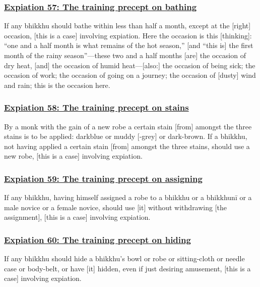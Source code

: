 \subsubsection*{\hyperref[pac57]{Expiation 57: The training precept on bathing}}
\label{exp57}
If any bhikkhu should bathe within less than half a month, except at the [right] occasion, [this is a case] involving expiation. Here the occasion is this [thinking]: ``one and a half month is what remains of the hot season,'' [and ``this is] the first month of the rainy season''—these two and a half months [are] the occasion of dry heat, [and] the occasion of humid heat—[also:] the occasion of being sick; the occasion of work; the occasion of going on a journey; the occasion of [dusty] wind and rain; this is the occasion here.



\subsubsection*{\hyperref[pac58]{Expiation 58: The training precept on stains}}
\label{exp58}
By a monk with the gain of a new robe a certain stain [from] amongst the three stains is to be applied: darkblue or muddy [-grey] or dark-brown. If a bhikkhu, not having applied a certain stain [from] amongst the three stains, should use a new robe, [this is a case] involving expiation.



\subsubsection*{\hyperref[pac59]{Expiation 59: The training precept on assigning}}
\label{exp59}
If any bhikkhu, having himself assigned a robe to a bhikkhu or a bhikkhunī or a male novice or a female novice, should use [it] without withdrawing [the assignment], [this is a case] involving expiation.



\subsubsection*{\hyperref[pac60]{Expiation 60: The training precept on hiding}}
\label{exp60}
If any bhikkhu should hide a bhikkhu's bowl or robe or sitting-cloth or needle case or body-belt, or have [it] hidden, even if just desiring amusement, [this is a case] involving expiation.

